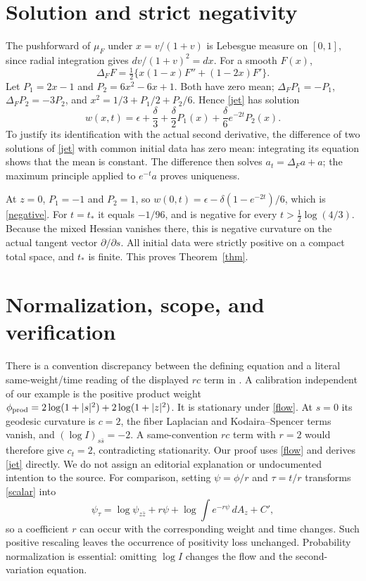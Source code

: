 \documentclass[11pt]{article}
\begin{document}
\section{Solution and strict negativity}
The pushforward of $\mu_F$ under $x=v/(1+v)$ is Lebesgue measure on
$[0,1]$, since radial integration gives $dv/(1+v)^2=dx$.
For a smooth $F(x)$,
\[
 \Delta_FF=\tfrac12\{x(1-x)F''+(1-2x)F'\}.
\]
Let $P_1=2x-1$ and $P_2=6x^2-6x+1$. Both have zero mean;
$\Delta_FP_1=-P_1$, $\Delta_FP_2=-3P_2$, and
$x^2=1/3+P_1/2+P_2/6$. Hence \eqref{jet} has solution
\begin{equation}\label{solution}
 w(x,t)=\epsilon+\frac\delta3+\frac\delta2P_1(x)
                   +\frac\delta6e^{-2t}P_2(x).
\end{equation}
To justify its identification with the actual second derivative, the difference
of two solutions of \eqref{jet} with common initial data has zero mean:
integrating its equation shows that the mean is constant. The difference
then solves $a_t=\Delta_Fa+a$; the maximum principle applied to $e^{-t}a$
proves uniqueness.

At $z=0$, $P_1=-1$ and $P_2=1$, so
$w(0,t)=\epsilon-\delta(1-e^{-2t})/6$, which is \eqref{negative}.
For $t=t_*$ it equals $-1/96$, and is negative for every
$t>\tfrac12\log(4/3)$. Because the mixed Hessian vanishes there,
this is negative curvature on the actual tangent vector $\partial/\partial s$.
All initial data were strictly positive on a compact total space, and
$t_*$ is finite. This proves Theorem~\ref{thm}.

\section{Normalization, scope, and verification}
There is a convention discrepancy between the defining equation
\cite[(13)]{N} and a literal same-weight/time reading of the displayed
$r c$ term in \cite[(14)]{N}. A calibration independent of our example is
the positive product weight
$\phi_{\rm prod}=2\log(1+|s|^2)+2\log(1+|z|^2)$.
It is stationary under \eqref{flow}. At $s=0$ its geodesic curvature is
$c=2$, the fiber Laplacian and Kodaira--Spencer terms vanish, and
$(\log I)_{s\bar s}=-2$. A same-convention $r c$ term with $r=2$
would therefore give $c_t=2$, contradicting stationarity.
Our proof uses \eqref{flow} and derives \eqref{jet} directly.
We do not assign an editorial explanation or undocumented intention to the
source. For comparison, setting $\psi=\phi/r$ and $\tau=t/r$ transforms
\eqref{scalar} into
\[
 \psi_\tau=\log\psi_{z\bar z}+r\psi+
           \log\int e^{-r\psi}\,dA_z+C',
\]
so a coefficient $r$ can occur with the corresponding weight and time
changes. Such positive rescaling leaves the occurrence of positivity loss
unchanged. Probability normalization is essential: omitting $\log I$
changes the flow and the second-variation equation.
\end{document}

